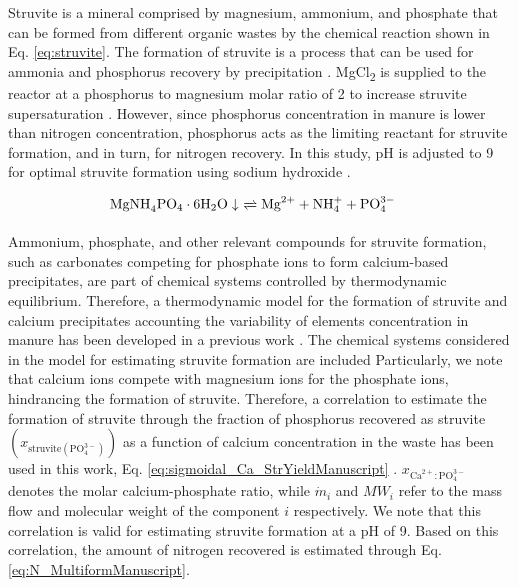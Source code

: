 \begin{refsection}[referencesCh6]
Struvite is a mineral comprised by magnesium, ammonium, and phosphate that can be formed from different  organic wastes by the chemical reaction shown in Eq. \ref{eq:struvite}. The formation of struvite is a process that can be used for ammonia and phosphorus recovery by precipitation \citep{martin2020m}. MgCl\textsubscript{2} is supplied to the reactor at a phosphorus to magnesium molar ratio of 2 to increase struvite supersaturation \citep{bhuiyan2008phosphorus}. However, since phosphorus concentration in manure is lower than nitrogen concentration, phosphorus acts as the limiting reactant for struvite formation, and in turn, for nitrogen recovery. In this study, pH is adjusted to 9 for optimal struvite formation using sodium hydroxide \citep{Tao}.

\begin{align}
	& \text{MgNH}_{4}\text{PO}_{4} \cdot 6\text{H}_{2}\text{O} \downarrow \ \xrightleftharpoons[]{} \text{Mg}^{2+} + \text{NH}_{4}^{+} + \text{PO}_{4}^{3-} \label{eq:struvite}
\end{align}

Ammonium, phosphate, and other relevant compounds for struvite formation, such as carbonates competing for phosphate ions to form calcium-based precipitates, are part of chemical systems controlled by thermodynamic equilibrium. Therefore, a thermodynamic model for the formation of struvite and calcium precipitates accounting the variability of elements concentration in manure has been developed in a previous work \citep{martin2020m}.
The chemical systems considered in the model for estimating struvite formation are included {\color{blue}{in Tables 1S and 2S of the Supplementary Material.}}
Particularly, we note that calcium ions compete with magnesium ions for the phosphate ions, hindrancing the formation of struvite. Therefore, a correlation
to estimate the formation of struvite through the fraction of phosphorus recovered as struvite $\left(x_{\text{struvite} \left(\text{PO}_{4}^{3-}\right) }\right) $ as a function of calcium concentration in the waste has been used in this work, Eq. \ref{eq:sigmoidal_Ca_StrYieldManuscript} \citep{martin2020m}. $x_{\text{Ca}^{2+}:\text{PO}_{4}^{3-}}$ denotes the molar calcium-phosphate ratio, while $\dot{m}_{i}$ and $MW_i$ refer to the mass flow and molecular weight of the component $i$ respectively. We note that this correlation is valid for estimating struvite formation at a pH of 9.
Based on this correlation,
the amount of nitrogen recovered is estimated through Eq. \ref{eq:N_MultiformManuscript}.


\end{refsection}
